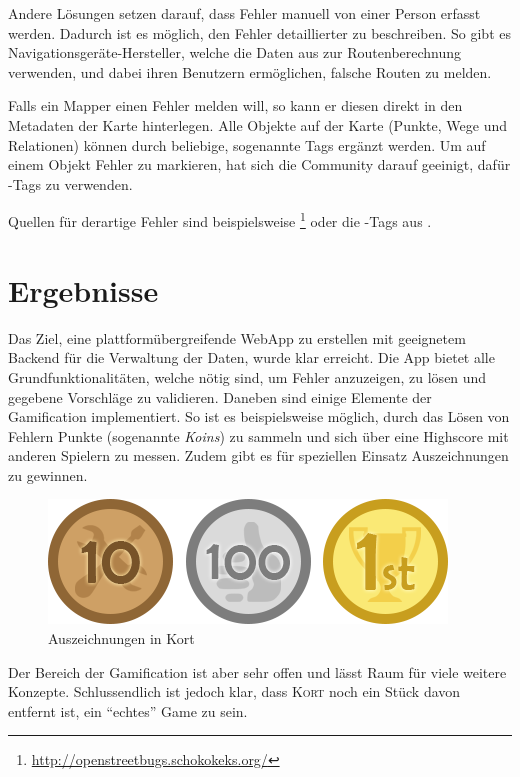 Andere Lösungen setzen darauf, dass Fehler manuell von einer Person erfasst werden. Dadurch ist es möglich, den Fehler detaillierter zu beschreiben. 
So gibt es Navigationsgeräte-Hersteller, welche die Daten aus  zur Routenberechnung verwenden, und dabei ihren Benutzern ermöglichen, falsche Routen zu melden.

Falls ein \gls{Mapper} einen Fehler melden will, so kann er diesen direkt in den Metadaten der Karte hinterlegen. Alle Objekte auf der Karte (Punkte, Wege und Relationen) können durch beliebige, sogenannte  \glspl{Tag} ergänzt werden.
Um auf einem Objekt Fehler zu markieren, hat sich die Community darauf geeinigt, dafür -\glspl{Tag} zu verwenden.

Quellen für derartige Fehler sind beispielsweise \footnote{\url{http://openstreetbugs.schokokeks.org/}} oder die -\glspl{Tag} aus .

\section*{Ergebnisse}
Das Ziel, eine plattformübergreifende \gls{WebApp} zu erstellen mit geeignetem Backend für die Verwaltung der Daten, wurde klar erreicht.
Die App bietet alle Grundfunktionalitäten, welche nötig sind, um Fehler anzuzeigen, zu lösen und gegebene Vorschläge zu validieren.
Daneben sind einige Elemente der \gls{Gamification} implementiert. So ist es beispielsweise möglich, durch das Lösen von Fehlern Punkte (sogenannte \emph{Koins}) zu sammeln und sich über eine Highscore mit anderen Spielern zu messen.
Zudem gibt es für speziellen Einsatz Auszeichnungen zu gewinnen.

\begin{figure}[H]
	\centering
	\includegraphics[scale=0.6]{images/gamification/gamification-badges}
	\caption{Auszeichnungen in Kort}
	\label{image-kort-badges}
\end{figure}

Der Bereich der \gls{Gamification} ist aber sehr offen und lässt Raum für viele weitere Konzepte. Schlussendlich ist jedoch klar, dass \textsc{Kort} noch ein Stück davon entfernt ist, ein "`echtes"' Game zu sein.

